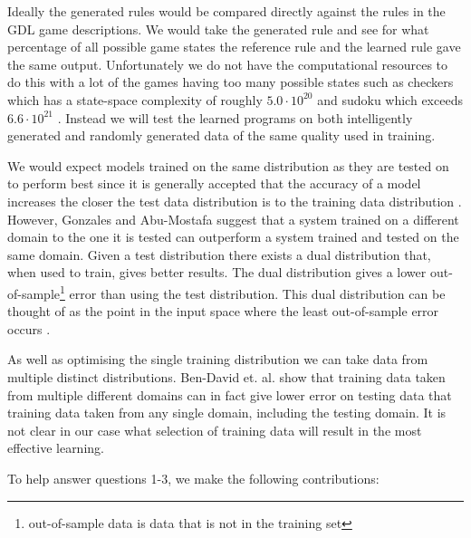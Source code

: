 Ideally the generated rules would be compared directly against the rules in the GDL game descriptions. We would take the generated rule and see for what percentage of all possible game states the reference rule and the learned rule gave the same output. Unfortunately we do not have the computational resources to do this with a lot of the games having too many possible states such as checkers which has a state-space complexity of roughly $5.0 \cdot 10^{20}$ \cite{Horssen/Checkers} and sudoku which exceeds $6.6 \cdot 10^{21}$ \cite{Felgenhauer/Suduko}. Instead we will test the learned programs on both intelligently generated and randomly generated data of the same quality used in training.

We would expect models trained on the same distribution as they are tested on to perform best since it is generally accepted that the accuracy of a model increases the closer the test data distribution is to the training data distribution  \cite{Mitchell/MachineLearing}. However, Gonzales and Abu-Mostafa \cite{Gonzalez/MismatchedOutperform} suggest that a system trained on a different domain to the one it is tested can outperform a system trained and tested on the same domain. Given a test distribution there exists a dual distribution that, when used to train, gives better results. The dual distribution gives a lower out-of-sample\footnote{out-of-sample data is data that is not in the training set} error than using the test distribution. This dual distribution can be thought of as the point in the input space where the least out-of-sample error occurs \cite{Gonzalez/MismatchedOutperform}.

As well as optimising the single training distribution we can take data from multiple distinct distributions. Ben-David et. al. \cite{Ben-David/DifferentDomains} show that training data taken from multiple different domains can in fact give lower error on testing data that training data taken from any single domain, including the testing domain. It is not clear in our case what selection of training data will result in the most effective learning.

To help answer questions 1-3, we make the following contributions:

